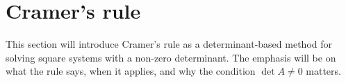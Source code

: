 \section{Cramer's rule}

This section will introduce Cramer's rule as a determinant-based method for solving square systems with a non-zero determinant. The emphasis will be on what the rule says, when it applies, and why the condition \(\det A\ne0\) matters.
